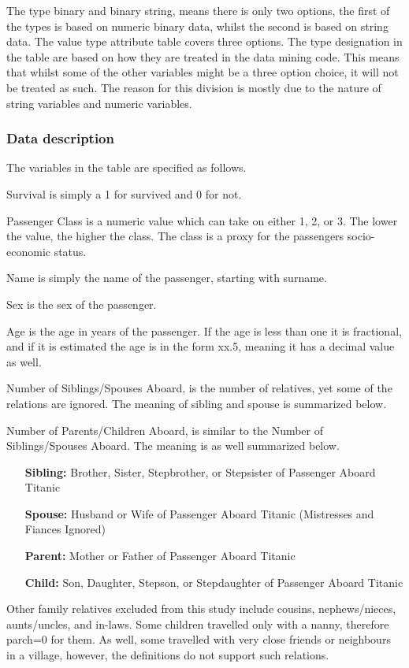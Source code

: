 \documentclass[a4paper,11pt]{article}
\begin{document}
The type binary and binary string, means there is only two options, the first of the types is based on numeric binary data, whilst the second is based on string data. The value type attribute table covers three options. The type designation in the table are based on how they are treated in the data mining code. This means that whilst some of the other variables might be a three option choice, it will not be treated as such. The reason for this division is mostly due to the nature of string variables and numeric variables.

\subsubsection{Data description}
The variables in the table are specified as follows. 

Survival is simply a 1 for survived and 0 for not. 

Passenger Class is a numeric value which can take on either 1, 2, or 3. The lower the value, the higher the class. The class is a proxy for the passengers socio-economic status.

Name is simply the name of the passenger, starting with surname.

Sex is the sex of the passenger.

Age is the age in years of the passenger. If the age is less than one it is fractional, and if it is estimated the age is in the form xx.5, meaning it has a decimal value as well.

Number of Siblings/Spouses Aboard, is the number of relatives, yet some of the relations are ignored. The meaning of sibling and spouse is summarized below.

Number of Parents/Children Aboard, is similar to the Number of Siblings/Spouses Aboard. The meaning is as well summarized below.
\begin{itemize}
	\item[\textbf{Sibling:}] Brother, Sister, Stepbrother, or Stepsister of Passenger Aboard Titanic
	\item[\textbf{Spouse:}] Husband or Wife of Passenger Aboard Titanic (Mistresses and Fiances Ignored)
\item[\textbf{Parent:}] Mother or Father of Passenger Aboard Titanic
\item[\textbf{Child:}] Son, Daughter, Stepson, or Stepdaughter of Passenger Aboard Titanic
\end{itemize}

Other family relatives excluded from this study include cousins, nephews/nieces, aunts/uncles, and in-laws.  Some children travelled only with a nanny, therefore parch=0 for them.  As well, some travelled with very close friends or neighbours in a village, however, the definitions do not support such relations.
\end{document}
